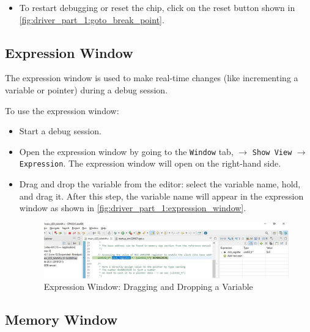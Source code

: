 \begin{itemize}
\begin{itemize}
    \item To restart debugging or reset the chip, click on the reset button shown in \autoref{fig:driver_part_1:goto_break_point}.
\end{itemize}


    
\end{itemize}

\subsection{Expression Window}

The expression window is used to make real-time changes (like incrementing a variable or pointer) during a debug session. 

To use the expression window:

\begin{itemize}
    \item Start a debug session.

    \item Open the expression window by going to the \verb|Window| tab, $\rightarrow$ \verb|Show View| $\rightarrow$ \verb|Expression|. The expression window will open on the right-hand side.


    \item Drag and drop the variable from the editor: select the variable name, hold, and drag it. After this step, the variable name will appear in the expression window as shown in \autoref{fig:driver_part_1:expression_window}.


\begin{figure}[h]
\centering
\includegraphics[scale=0.5]{Figures/driver_part_1/expression_window}
\caption{Expression Window: Dragging and Dropping a Variable}
\label{fig:driver_part_1:expression_window}
\end{figure}  

    
\end{itemize}


\subsection{Memory Window}

